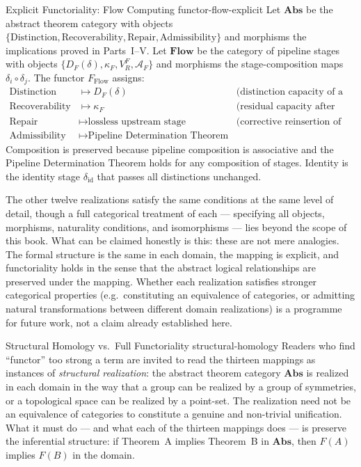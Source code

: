 \documentclass[12pt,twoside,openright]{book}
\newcommand{\adm}{\mathcal{A}}
\begin{document}
\begin{example}{Explicit Functoriality: Flow Computing}%
  {functor-flow-explicit}
  Let $\mathbf{Abs}$ be the abstract theorem category with
  objects $\{\text{Distinction}, \text{Recoverability},
  \text{Repair}, \text{Admissibility}\}$ and morphisms the
  implications proved in Parts~I--V. Let $\mathbf{Flow}$
  be the category of pipeline stages with objects
  $\{D_F(\delta), \kappa_F, V_R^F, \adm_F\}$ and morphisms
  the stage-composition maps $\delta_i \circ \delta_j$.
  The functor $F_\mathrm{Flow}$ assigns:
  \begin{align*}
    \text{Distinction} &\mapsto D_F(\delta)
      && \text{(distinction capacity of a stage)} \\
    \text{Recoverability} &\mapsto \kappa_F
      && \text{(residual capacity after lossy stage)} \\
    \text{Repair} &\mapsto \text{lossless upstream stage}
      && \text{(corrective reinsertion of distinctions)} \\
    \text{Admissibility} &\mapsto
      \text{Pipeline Determination Theorem condition}
  \end{align*}
  Composition is preserved because pipeline composition
  is associative and the Pipeline Determination Theorem
  holds for any composition of stages. Identity is the
  identity stage $\delta_\mathrm{id}$ that passes all
  distinctions unchanged.
\end{example}

The other twelve realizations satisfy the same conditions
at the same level of detail, though a full categorical
treatment of each — specifying all objects, morphisms,
naturality conditions, and isomorphisms — lies beyond the
scope of this book. What can be claimed honestly is this:
these are not mere analogies. The formal structure is the
same in each domain, the mapping is explicit, and
functoriality holds in the sense that the abstract
logical relationships are preserved under the mapping.
Whether each realization satisfies stronger categorical
properties (e.g.\ constituting an equivalence of categories,
or admitting natural transformations between different
domain realizations) is a programme for future work, not
a claim already established here.

\begin{remark}{Structural Homology vs.\ Full Functoriality}%
  {structural-homology}
  Readers who find ``functor'' too strong a term are
  invited to read the thirteen mappings as instances of
  \emph{structural realization}: the abstract theorem
  category $\mathbf{Abs}$ is realized in each domain
  in the way that a group can be realized by a group of
  symmetries, or a topological space can be realized by a
  point-set. The realization need not be an equivalence of
  categories to constitute a genuine and non-trivial
  unification. What it must do --- and what each of the
  thirteen mappings does --- is preserve the inferential
  structure: if Theorem~A implies Theorem~B in $\mathbf{Abs}$,
  then $F(A)$ implies $F(B)$ in the domain.
\end{remark}
\end{document}
